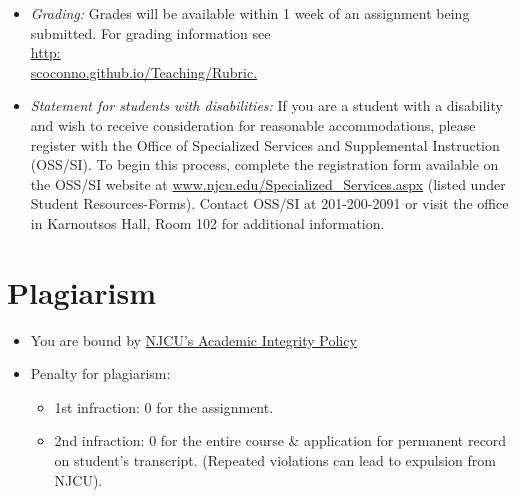 \documentclass[11pt,article,oneside]{memoir}
\begin{document}
\begin{itemize}
\item \textit{Grading:} Grades will be available within 1 week of an assignment being submitted. For grading information see\\ \href{http://scoconno.github.io/Teaching/Rubric}{http:\\scoconno.github.io/Teaching/Rubric.}


\item \textit{Statement for students with disabilities:} If you are a student
with a disability and wish to receive consideration for reasonable
accommodations, please register with the Office of Specialized Services
and Supplemental Instruction (OSS/SI). To begin this process, complete
the registration form available on the OSS/SI website at
\href{http://www.njcu.edu/Specialized_Services.aspx}{www.njcu.edu/Specialized\_Services.aspx}
(listed under Student Resources-Forms). Contact OSS/SI at 201-200-2091
or visit the office in Karnoutsos Hall, Room 102 for additional
information.
\end{itemize}

\section{Plagiarism}

\begin{itemize} 
\item You are bound by \href{http://www.njcu.edu/uploadedFiles/About_NJCU/Governance_and_Organization/University_Senate/Policies/Academic\%20INTEGRITY\%20POLICY\%20FINAL\%202-04.pdf}{NJCU's Academic Integrity Policy}
\item Penalty for plagiarism:
\begin{itemize}
\item 1st infraction: 0 for the assignment. 
\item 2nd infraction: 0 for the entire course \& application for permanent record on student's transcript. (Repeated violations can lead to expulsion from NJCU). 
\end{itemize}
\end{itemize}
\end{document}
